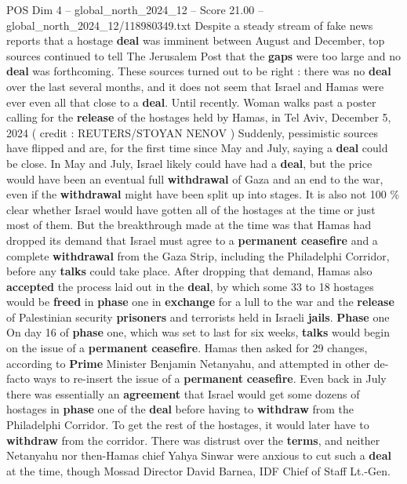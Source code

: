 \begin{textsample}{POS Dim 4 – global\_north\_2024\_12 – Score 21.00 – global\_north\_2024\_12/118980349.txt}  \label{ex:f4_pos_330}
Despite a steady stream of fake news reports that a hostage \textbf{deal} was imminent between August and December, top sources continued to tell The Jerusalem Post that the \textbf{gaps} were too large and no \textbf{deal} was forthcoming.
These sources turned out to be right : there was no \textbf{deal} over the last several months, and it does not seem that Israel and Hamas were ever even all that close to a \textbf{deal}.
Until recently.
Woman walks past a poster calling for the \textbf{release} of the hostages held by Hamas, in Tel Aviv, December 5, 2024 ( credit : REUTERS/STOYAN NENOV ) Suddenly, pessimistic sources have flipped and are, for the first time since May and July, saying a \textbf{deal} could be close.
In May and July, Israel likely could have had a \textbf{deal}, but the price would have been an eventual full \textbf{withdrawal} of Gaza and an end to the war, even if the \textbf{withdrawal} might have been split up into stages.
It is also not 100 \% clear whether Israel would have gotten all of the hostages at the time or just most of them.
But the breakthrough made at the time was that Hamas had dropped its demand that Israel must agree to a \textbf{permanent} \textbf{ceasefire} and a complete \textbf{withdrawal} from the Gaza Strip, including the Philadelphi Corridor, before any \textbf{talks} could take place.
After dropping that demand, Hamas also \textbf{accepted} the process laid out in the \textbf{deal}, by which some 33 to 18 hostages would be \textbf{freed} in \textbf{phase} one in \textbf{exchange} for a lull to the war and the \textbf{release} of Palestinian security \textbf{prisoners} and terrorists held in Israeli \textbf{jails}. \textbf{Phase} one On day 16 of \textbf{phase} one, which was set to last for six weeks, \textbf{talks} would begin on the issue of a \textbf{permanent} \textbf{ceasefire}.
Hamas then asked for 29 changes, according to \textbf{Prime} Minister Benjamin Netanyahu, and attempted in other de-facto ways to re-insert the issue of a \textbf{permanent} \textbf{ceasefire}.
Even back in July there was essentially an \textbf{agreement} that Israel would get some dozens of hostages in \textbf{phase} one of the \textbf{deal} before having to \textbf{withdraw} from the Philadelphi Corridor.
To get the rest of the hostages, it would later have to \textbf{withdraw} from the corridor.
There was distrust over the \textbf{terms}, and neither Netanyahu nor then-Hamas chief Yahya Sinwar were anxious to cut such a \textbf{deal} at the time, though Mossad Director David Barnea, IDF Chief of Staff Lt.-Gen.

\end{textsample}

